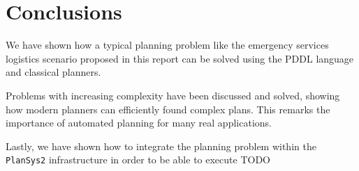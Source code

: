 \section{Conclusions}
\label{sec5}

We have shown how a typical planning problem like the emergency services logistics scenario 
proposed in this report can be solved using the PDDL language and classical planners.

Problems with increasing complexity have been discussed and solved, showing how modern planners can 
efficiently found complex plans. This remarks the importance of automated planning for many real applications.

Lastly, we have shown how to integrate the planning problem within the \texttt{PlanSys2} infrastructure
in order to be able to execute TODO